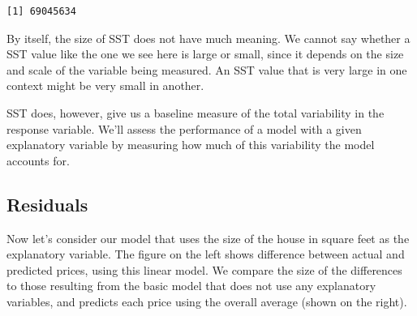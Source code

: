 \documentclass[
  letterpaper,
  DIV=11,
  numbers=noendperiod]{scrreprt}
\newenvironment{Shaded}{\begin{snugshade}}{\end{snugshade}}
\newcommand{\AttributeTok}[1]{\textcolor[rgb]{0.40,0.45,0.13}{#1}}
\newcommand{\ConstantTok}[1]{\textcolor[rgb]{0.56,0.35,0.01}{#1}}
\newcommand{\DecValTok}[1]{\textcolor[rgb]{0.68,0.00,0.00}{#1}}
\newcommand{\FunctionTok}[1]{\textcolor[rgb]{0.28,0.35,0.67}{#1}}
\newcommand{\NormalTok}[1]{\textcolor[rgb]{0.00,0.23,0.31}{#1}}
\newcommand{\OtherTok}[1]{\textcolor[rgb]{0.00,0.23,0.31}{#1}}
\newcommand{\SpecialCharTok}[1]{\textcolor[rgb]{0.37,0.37,0.37}{#1}}
\newcommand{\StringTok}[1]{\textcolor[rgb]{0.13,0.47,0.30}{#1}}
\begin{document}
\begin{verbatim}
[1] 69045634
\end{verbatim}

By itself, the size of SST does not have much meaning. We cannot say
whether a SST value like the one we see here is large or small, since it
depends on the size and scale of the variable being measured. An SST
value that is very large in one context might be very small in another.

SST does, however, give us a baseline measure of the total variability
in the response variable. We'll assess the performance of a model with a
given explanatory variable by measuring how much of this variability the
model accounts for.

\subsection{Residuals}\label{residuals}

Now let's consider our model that uses the size of the house in square
feet as the explanatory variable. The figure on the left shows
difference between actual and predicted prices, using this linear model.
We compare the size of the differences to those resulting from the basic
model that does not use any explanatory variables, and predicts each
price using the overall average (shown on the right).

\begin{Shaded}
\end{Shaded}
\end{document}
